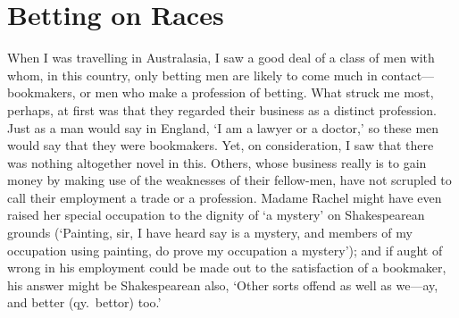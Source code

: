 \documentclass[letterpaper,12pt,oneside,openany]{memoir}
\begin{document}
\chapter{Betting on Races}

When I was travelling in Australasia, I saw a good
deal of a class of men with whom, in this country,
only betting men are likely to come much in contact---bookmakers,
or men who make a profession of betting.
What struck me most, perhaps, at first was
that they regarded their business as a distinct profession.
Just as a man would say in England, `I am
a lawyer or a doctor,' so these men would say that they
were bookmakers. Yet, on consideration, I saw that
there was nothing altogether novel in this. Others,
whose business really is to gain money by making
use of the weaknesses of their fellow-men, have not
scrupled to call their employment a trade or a profession.
Madame Rachel might have even raised her
special occupation to the dignity of `a mystery' on
Shakespearean grounds (`Painting, sir, I have heard
say is a mystery, and members of my occupation using
painting, do prove my occupation a mystery'); and if
aught of wrong in his employment could be made out
to the satisfaction of a bookmaker, his answer might be
Shakespearean also, `Other sorts offend as well as we---ay,
and better (qy.\ bettor) too.'
\end{document}
